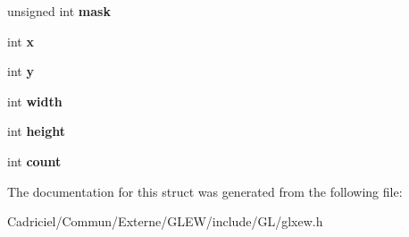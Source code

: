 \begin{DoxyCompactItemize}
\item 
\hypertarget{struct_g_l_x_buffer_clobber_event_s_g_i_x_a74b4ad1ad3cac011001151411f621da1}{unsigned int {\bfseries mask}}\label{struct_g_l_x_buffer_clobber_event_s_g_i_x_a74b4ad1ad3cac011001151411f621da1}

\item 
\hypertarget{struct_g_l_x_buffer_clobber_event_s_g_i_x_a5118d48c3c8d5253d39922b5014b52ff}{int {\bfseries x}}\label{struct_g_l_x_buffer_clobber_event_s_g_i_x_a5118d48c3c8d5253d39922b5014b52ff}

\item 
\hypertarget{struct_g_l_x_buffer_clobber_event_s_g_i_x_aef21efa11558a5b67861f96471c56003}{int {\bfseries y}}\label{struct_g_l_x_buffer_clobber_event_s_g_i_x_aef21efa11558a5b67861f96471c56003}

\item 
\hypertarget{struct_g_l_x_buffer_clobber_event_s_g_i_x_adad23535733161528427584a42bfc6eb}{int {\bfseries width}}\label{struct_g_l_x_buffer_clobber_event_s_g_i_x_adad23535733161528427584a42bfc6eb}

\item 
\hypertarget{struct_g_l_x_buffer_clobber_event_s_g_i_x_a7838dbabb76c22aa8241310a3f2363ea}{int {\bfseries height}}\label{struct_g_l_x_buffer_clobber_event_s_g_i_x_a7838dbabb76c22aa8241310a3f2363ea}

\item 
\hypertarget{struct_g_l_x_buffer_clobber_event_s_g_i_x_ad8f4f0aae058e0a1ff542679823e37a9}{int {\bfseries count}}\label{struct_g_l_x_buffer_clobber_event_s_g_i_x_ad8f4f0aae058e0a1ff542679823e37a9}

\end{DoxyCompactItemize}


The documentation for this struct was generated from the following file\-:\begin{DoxyCompactItemize}
\item 
Cadriciel/\-Commun/\-Externe/\-G\-L\-E\-W/include/\-G\-L/glxew.\-h\end{DoxyCompactItemize}
